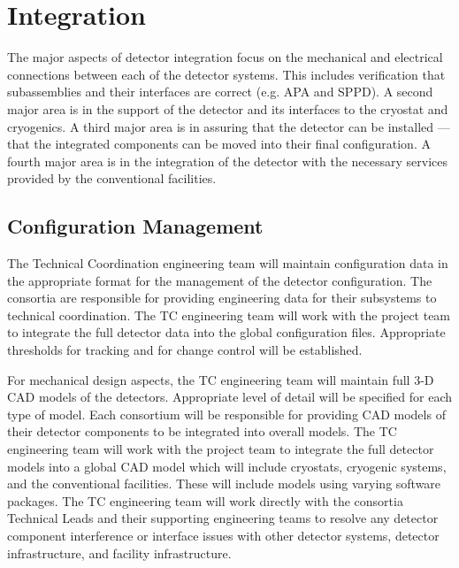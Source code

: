 \section{Integration}
\label{sec:fdsp-coord-integ-sysengr}

The major aspects of detector integration focus on the mechanical and
electrical connections between each of the detector systems. This
includes verification that subassemblies and their interfaces are
correct (e.g. APA and SPPD). A second major area is in the support of
the detector and its interfaces to the cryostat and cryogenics. A
third major area is in assuring that the detector can be installed ---
that the integrated components can be moved into their final
configuration. A fourth major area is in the integration of the
detector with the necessary services provided by the conventional
facilities.

\subsection{Configuration Management}
\label{sec:fdsp-coord-integ-config}

The  Technical Coordination engineering team will maintain
configuration data in the appropriate format for the management of the
detector configuration. The consortia are responsible for providing
engineering data for their subsystems to technical coordination. The
TC engineering team will work with the  project team to
integrate the full detector data into the global 
configuration files. Appropriate thresholds for tracking and for
change control will be established.

For mechanical design aspects, the  TC engineering team
will maintain full 3-D CAD models of the detectors. Appropriate level
of detail will be specified for each type of model. Each consortium
will be responsible for providing CAD models of their detector
components to be integrated into overall models. The TC engineering
team will work with the  project team to integrate the
full detector models into a global  CAD model which will
include cryostats, cryogenic systems, and the conventional
facilities. These will include models using varying software
packages. The TC engineering team will work directly with the
consortia Technical Leads and their supporting engineering teams to
resolve any detector component interference or interface issues with
other detector systems, detector infrastructure, and facility
infrastructure.

